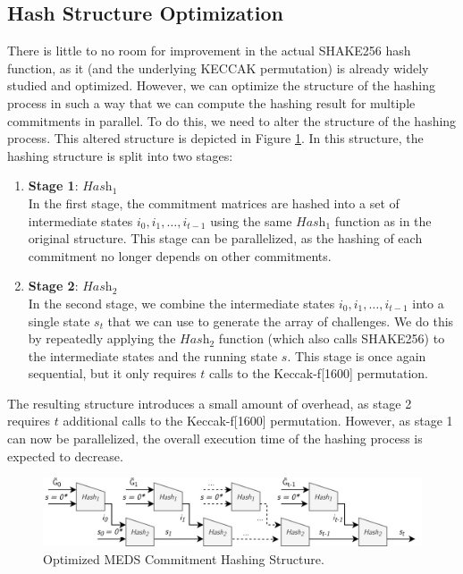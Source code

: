 \documentclass[11pt,a4paper]{report}
\theoremstyle{definition}
\begin{document}
\subsection{Hash Structure Optimization}
There is little to no room for improvement in the actual SHAKE256 hash function, as it (and the underlying KECCAK permutation) is already widely studied and optimized. However, we can optimize the structure of the hashing process in such a way that we can compute the hashing result for multiple commitments in parallel. To do this, we need to alter the structure of the hashing process. This altered structure is depicted in Figure \ref{fig:hashstructureopt}. In this structure, the hashing structure is split into two stages:
\begin{enumerate}
  \item \textbf{Stage 1}: $\textit{Hash}_1$\\
  In the first stage, the commitment matrices are hashed into a set of intermediate states $i_0, i_1, \ldots, i_{t-1}$ using the same $\textit{Hash}_1$ function as in the original structure. This stage can be parallelized, as the hashing of each commitment no longer depends on other commitments.
  \item \textbf{Stage 2}: $\textit{Hash}_2$\\
  In the second stage, we combine the intermediate states $i_0, i_1, \ldots, i_{t-1}$ into a single state $s_t$ that we can use to generate the array of challenges. We do this by repeatedly applying the $\textit{Hash}_2$ function (which also calls SHAKE256) to the intermediate states and the running state $s$. This stage is once again sequential, but it only requires $t$ calls to the Keccak-f[1600] permutation.
\end{enumerate}
The resulting structure introduces a small amount of overhead, as stage 2 requires $t$ additional calls to the Keccak-f[1600] permutation. However, as stage 1 can now be parallelized, the overall execution time of the hashing process is expected to decrease.

\begin{figure}
  \centering
  \includegraphics[width=\textwidth]{hash/hash_struct_par.png}
  \caption{Optimized MEDS Commitment Hashing Structure.}
  \label{fig:hashstructureopt}
\end{figure}
\end{document}
